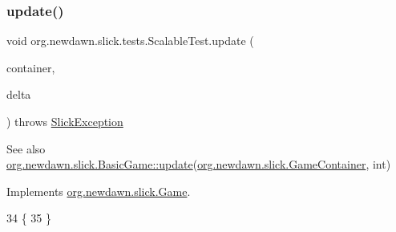 \subsubsection{\texorpdfstring{update()}{update()}}
{\footnotesize\ttfamily void org.\+newdawn.\+slick.\+tests.\+Scalable\+Test.\+update (\begin{DoxyParamCaption}\item[{\mbox{\hyperlink{classorg_1_1newdawn_1_1slick_1_1_game_container}{Game\+Container}}}]{container,  }\item[{int}]{delta }\end{DoxyParamCaption}) throws \mbox{\hyperlink{classorg_1_1newdawn_1_1slick_1_1_slick_exception}{Slick\+Exception}}\hspace{0.3cm}{\ttfamily [inline]}}

\begin{DoxySeeAlso}{See also}
\mbox{\hyperlink{classorg_1_1newdawn_1_1slick_1_1_basic_game_acfe6fa05aef83bff1631af91a3e4bd20}{org.\+newdawn.\+slick.\+Basic\+Game\+::update}}(\mbox{\hyperlink{classorg_1_1newdawn_1_1slick_1_1_game_container}{org.\+newdawn.\+slick.\+Game\+Container}}, int) 
\end{DoxySeeAlso}


Implements \mbox{\hyperlink{interfaceorg_1_1newdawn_1_1slick_1_1_game_ab07b2e9463ee4631620dde0de25bdee8}{org.\+newdawn.\+slick.\+Game}}.


\begin{DoxyCode}
34                                                                                  \{
35     \}
\end{DoxyCode}
